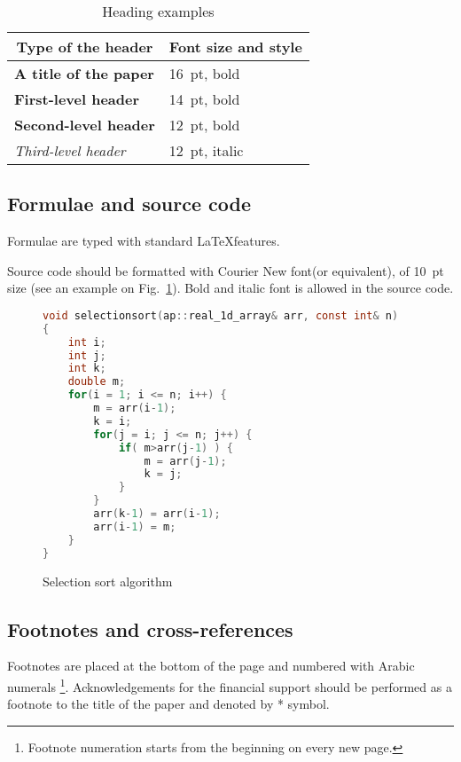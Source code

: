 \documentclass[11pt, oneside, a4paper]{article}
\begin{document}
\begin{table}[!ht]
	\caption{Heading examples}
	\label{table1}
	\begin{center}
	\begin{tabular}{|l|l|}
		\hline
		\multicolumn{1}{|c|}{\bf Type of the header} &
		\multicolumn{1}{c|}{\bf Font size and style} \\
		\hline
		\LARGE\bf A title of the paper & 16~pt, bold \\
		\hline
		\Large\bf First-level header & 14~pt, bold \\
		\hline
		\large\bf Second-level header& 12~pt, bold \\
		\hline
		\large\it Third-level header & 12~pt, italic \\
		\hline
	\end{tabular}
	\end{center}
\end{table}

\subsection{Formulae and source code}
Formulae are typed with standard \LaTeX features.

Source code should be formatted with Courier New font(or equivalent), 
of 10~pt size (see an example on Fig.~\ref{listing-sort}). 
Bold and italic font is allowed in the source code.

\begin{figure}[h]
\begin{lstlisting}[language=c]
void selectionsort(ap::real_1d_array& arr, const int& n)
{
    int i;
    int j;
    int k;
    double m;
    for(i = 1; i <= n; i++) {
        m = arr(i-1);
        k = i;
        for(j = i; j <= n; j++) {
            if( m>arr(j-1) ) {
                m = arr(j-1);
                k = j;
            }
        }
        arr(k-1) = arr(i-1);
        arr(i-1) = m;
    }
}
\end{lstlisting}
\caption{Selection sort algorithm}
\label{listing-sort}
\end{figure}

\subsection{Footnotes and cross-references}
Footnotes are placed at the bottom of the page and numbered with Arabic numerals 
\footnote{Footnote numeration starts from the beginning on every new page.}. 
Acknowledgements for the financial support should be performed 
as a footnote to the title of the paper and 
denoted by * symbol. 
\end{document}
